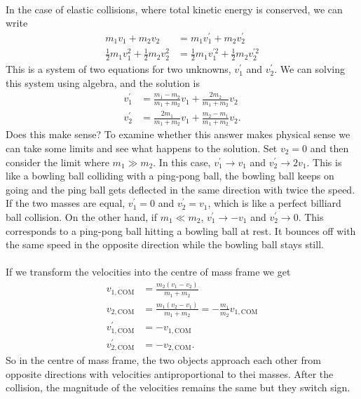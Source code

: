 \documentclass[../classical_mechanics.tex]{subfiles}
\begin{document}
        \paragraph{}
        In the case of elastic collisions, where total kinetic energy is conserved, we can write
        \begin{align}
            m_1v_1+m_2v_2&=m_1v_1^\prime+m_2v_2^\prime\\
            \frac{1}{2}m_1v_1^2+\frac{1}{2}m_2v_2^2&=\frac{1}{2}m_1v_1^{\prime 2}+\frac{1}{2}m_2v_2^{\prime 2}
        \end{align}
        This is a system of two equations for two unknowns, $v_1^\prime$ and $v_2^\prime$.
        We can solving this system using algebra, and the solution is
        \begin{align}
            v_1^\prime&=\frac{m_1-m_2}{m_1+m_2}v_1+\frac{2m_2}{m_1+m_2}v_2\\
            v_2^\prime&=\frac{2m_1}{m_1+m_2}v_1+\frac{m_2-m_1}{m_1+m_2}v_2.
        \end{align}
        Does this make sense?
        To examine whether this answer makes physical sense we can take some limits and see what happens to the solution.
        Set $v_2=0$ and then consider the limit where $m_1\gg m_2$.
        In this case, $v_1^\prime\to v_1$ and $v_2^\prime\to 2v_1$.
        This is like a bowling ball colliding with a ping-pong ball, the bowling ball keeps on going and the ping ball gets deflected in the same direction with twice the speed.
        If the two masses are equal, $v_1^\prime=0$ and $v_2^\prime=v_1$, which is like a perfect billiard ball collision.
        On the other hand, if $m_1\ll m_2$, $v_1^\prime\to -v_1$ and $v_2^\prime\to 0$.
        This corresponds to a ping-pong ball hitting a bowling ball at rest. It bounces off with the same speed in the opposite direction while the bowling ball stays still.

        \paragraph{}
        If we transform the velocities into the centre of mass frame we get
        \begin{align}
            v_{1,\text{COM}}&=\frac{m_2(v_1-v_2)}{m_1+m_2}\\
            v_{2,\text{COM}}&=\frac{m_1(v_2-v_1)}{m_1+m_2}=-\frac{m_1}{m_2}v_{1,\text{COM}}\\
            v_{1,\text{COM}}^\prime&=-v_{1,\text{COM}}\\
            v_{2,\text{COM}}^\prime&=-v_{2,\text{COM}}.
        \end{align}
        So in the centre of mass frame, the two objects approach each other from opposite directions with velocities antiproportional to thei masses.
        After the collision, the magnitude of the velocities remains the same but they switch sign.
\end{document}
